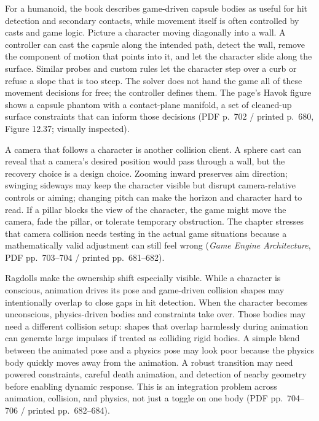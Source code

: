 For a humanoid, the book describes game-driven capsule bodies as useful for hit detection and secondary contacts, while movement itself is often controlled by casts and game logic. Picture a character moving diagonally into a wall. A controller can cast the capsule along the intended path, detect the wall, remove the component of motion that points into it, and let the character slide along the surface. Similar probes and custom rules let the character step over a curb or refuse a slope that is too steep. The solver does not hand the game all of these movement decisions for free; the controller defines them. The page's Havok figure shows a capsule phantom with a contact-plane manifold, a set of cleaned-up surface constraints that can inform those decisions (PDF p.~702 / printed p.~680, Figure 12.37; visually inspected).

A camera that follows a character is another collision client. A sphere cast can reveal that a camera's desired position would pass through a wall, but the recovery choice is a design choice. Zooming inward preserves aim direction; swinging sideways may keep the character visible but disrupt camera-relative controls or aiming; changing pitch can make the horizon and character hard to read. If a pillar blocks the view of the character, the game might move the camera, fade the pillar, or tolerate temporary obstruction. The chapter stresses that camera collision needs testing in the actual game situations because a mathematically valid adjustment can still feel wrong (\emph{Game Engine Architecture}, PDF pp.~703--704 / printed pp.~681--682).

Ragdolls make the ownership shift especially visible. While a character is conscious, animation drives its pose and game-driven collision shapes may intentionally overlap to close gaps in hit detection. When the character becomes unconscious, physics-driven bodies and constraints take over. Those bodies may need a different collision setup: shapes that overlap harmlessly during animation can generate large impulses if treated as colliding rigid bodies. A simple blend between the animated pose and a physics pose may look poor because the physics body quickly moves away from the animation. A robust transition may need powered constraints, careful death animation, and detection of nearby geometry before enabling dynamic response. This is an integration problem across animation, collision, and physics, not just a toggle on one body (PDF pp.~704--706 / printed pp.~682--684).

